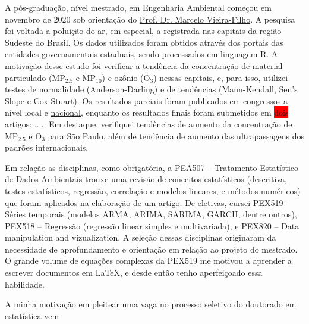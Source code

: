 \documentclass[12pt,a4paper]{article}
\begin{document}
	A pós-graduação, nível mestrado, em Engenharia Ambiental começou em novembro de 2020 sob orientação do \href{http://lattes.cnpq.br/5059318976988668}{Prof. Dr. Marcelo Vieira-Filho}. A pesquisa foi voltada a poluição do ar, em especial, a registrada nas capitais da região Sudeste do Brasil. Os dados utilizados foram obtidos através dos portais das entidades governamentais estaduais, sendo processados em linguagem R. A motivação desse estudo foi verificar a tendência da concentração de material particulado (MP$_{2.5}$ e MP$_{10}$) e ozônio (O$_3$) nessas capitais, e, para isso, utilizei testes de normalidade (Anderson-Darling) e de tendências (Mann-Kendall, Sen’s Slope e Cox-Stuart). Os resultados parciais foram publicados em congressos a nível local e \href{http://www.meioambientepocos.com.br/ANAIS2022/76%20-%20244016_crescimento-da-concentrao-de-materiais-particulados-e-oznio-em-capitais-brasileiras.pdf}{nacional}, enquanto os resultados finais foram submetidos em \colorbox{red}{dois} artigos: ..... Em destaque, verifiquei tendências de aumento da concentração de MP$_{2.5}$ e O$_3$ para São Paulo, além de tendência de aumento das ultrapassagens dos padrões internacionais.
	
	Em relação as disciplinas, como obrigatória, a PEA507 – Tratamento Estatístico de Dados Ambientais trouxe uma revisão de conceitos estatísticos (descritiva, testes estatísticos, regressão, correlação e modelos lineares, e métodos numéricos) que foram aplicados na elaboração de um artigo. De eletivas, cursei PEX519 – Séries temporais (modelos ARMA, ARIMA, SARIMA, GARCH, dentre outros), PEX518 – Regressão (regressão linear simples e multivariada), e PEX820 – Data manipulation and vizualization. A seleção dessas disciplinas originaram da necessidade de aprofundamento e orientação em relação ao projeto do mestrado. O grande volume de equações complexas da PEX519 me motivou a aprender a escrever documentos em \LaTeX, e desde então tenho aperfeiçoado essa habilidade.
	
	A minha motivação em pleitear uma vaga no processo seletivo do doutorado em estatística vem
	
	\label{LastPage}
\end{document}
